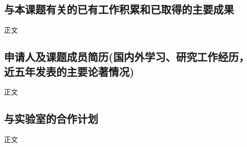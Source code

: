 
\subsection{与本课题有关的已有工作积累和已取得的主要成果}\label{BasisSubsec:HaveGot}
正文

\subsection{申请人及课题成员简历(国内外学习、研究工作经历，近五年发表的主要论著情况)}\label{BasisSubsec:RecentPub}
正文


\subsection{与实验室的合作计划}\label{BasisSubsec:PlanOfCooperate}
正文
